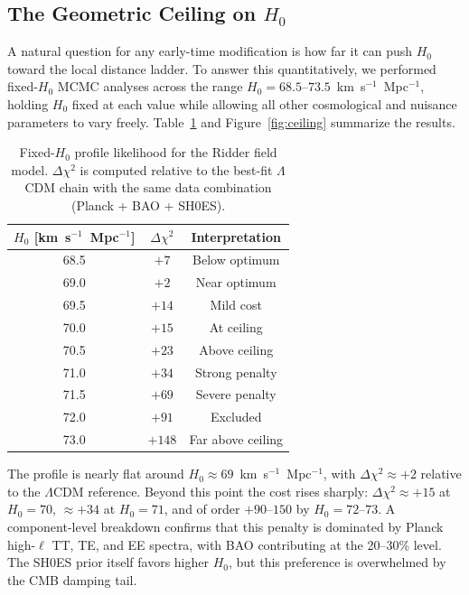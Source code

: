 
\subsection{The Geometric Ceiling on $H_0$}
\label{sec:geometric_ceiling}

A natural question for any early-time modification is how far it can push $H_0$ toward the local distance ladder. To answer this quantitatively, we performed fixed-$H_0$ MCMC analyses across the range $H_0 = 68.5$--$73.5$~km~s$^{-1}$~Mpc$^{-1}$, holding $H_0$ fixed at each value while allowing all other cosmological and nuisance parameters to vary freely. Table~\ref{tab:h0_ceiling} and Figure~\ref{fig:ceiling} summarize the results.

\begin{table}[ht]
\centering
\caption{Fixed-$H_0$ profile likelihood for the Ridder field model. $\Delta\chi^2$ is computed relative to the best-fit $\Lambda$CDM chain with the same data combination (Planck + BAO + SH0ES).}
\label{tab:h0_ceiling}
\begin{tabular}{ccc}
\toprule
$H_0$ [km~s$^{-1}$~Mpc$^{-1}$] & $\Delta\chi^2$ & Interpretation \\
\midrule
68.5 & $+7$ & Below optimum \\
69.0 & $+2$ & Near optimum \\
69.5 & $+14$ & Mild cost \\
70.0 & $+15$ & At ceiling \\
70.5 & $+23$ & Above ceiling \\
71.0 & $+34$ & Strong penalty \\
71.5 & $+69$ & Severe penalty \\
72.0 & $+91$ & Excluded \\
73.0 & $+148$ & Far above ceiling \\
\bottomrule
\end{tabular}
\end{table}

The profile is nearly flat around $H_0 \approx 69$~km~s$^{-1}$~Mpc$^{-1}$, with $\Delta\chi^2 \approx +2$ relative to the $\Lambda$CDM reference. Beyond this point the cost rises sharply: $\Delta\chi^2 \approx +15$ at $H_0 = 70$, $\approx +34$ at $H_0 = 71$, and of order $+90$--$150$ by $H_0 = 72$--$73$. A component-level breakdown confirms that this penalty is dominated by Planck high-$\ell$ TT, TE, and EE spectra, with BAO contributing at the 20--30\% level. The SH0ES prior itself favors higher $H_0$, but this preference is overwhelmed by the CMB damping tail.

